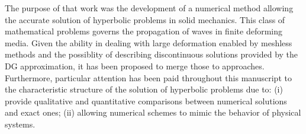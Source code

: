 The purpose of that work was the development of a numerical method allowing the accurate solution of hyperbolic problems in solid mechanics.
This class of mathematical problems governs the propagation of waves in finite deforming media.
Given the ability in dealing with large deformation enabled by meshless methods and the possiblity of describing discontinuous solutions provided by the DG approximation, it has been proposed to merge those to approaches.
Furthermore, particular attention has been paid throughout this manuscript to the characteristic structure of the solution of hyperbolic problems due to: (i) provide qualitative and quantitative comparisons between numerical solutions and exact ones; (ii) allowing numerical schemes to mimic the behavior of physical systems.








